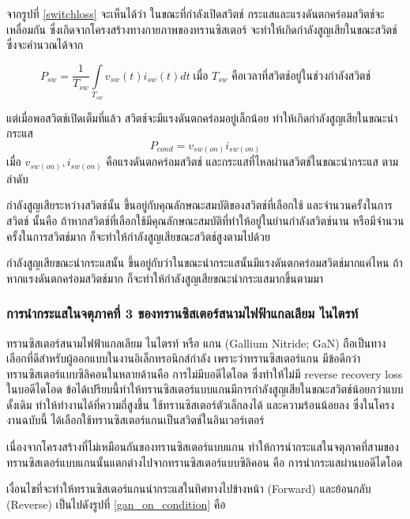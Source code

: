 \documentclass[11pt,a4paper]{article}
\begin{document}
จากรูปที่ \ref{switchloss} จะเห็นได้ว่า ในขณะที่กำลังเปิดสวิตช์ กระแสและแรงดันตกคร่อมสวิตช์จะเหลื่อมกัน ซึ่งเกิดจากโครงสร้างทางกายภาพของทรานซิสเตอร์ จะทำให้เกิดกำลังสูญเสียในขณะสวิตช์ ซึ่งจะคำนวณได้จาก

\begin{equation}
    P_{sw} = \frac{1}{T_{sw}}\int\limits_{T_{sw}}{v_{sw}(t)i_{sw}(t)dt}\; \text{เมื่อ $T_{sw}$ คือเวลาที่สวิตช์อยู่ในช่วงกำลังสวิตช์}
\end{equation}

แต่เมื่อพอสวิตช์เปิดเต็มที่แล้ว สวิตช์จะมีแรงดันตกคร่อมอยู่เล็กน้อย ทำให้เกิดกำลังสูญเสียในขณะนำกระแส
\begin{equation}
    P_{cond} = v_{sw(on)}i_{sw(on)}
\end{equation}
เมื่อ $v_{sw(on)},i_{sw(on)}$ คือแรงดันตกคร่อมสวิตช์ และกระแสที่ไหลผ่านสวิตช์ในขณะนำกระแส ตามลำดับ

กำลังสูญเสียระหว่างสวิตช์นั้น ขึ้นอยู่กับคุณลักษณะสมบัติของสวิตช์ที่เลือกใช้ และจำนวนครั้งในการสวิตช์ นั้นคือ ถ้าหากสวิตช์ที่เลือกใช้มีคุณลักษณะสมบัติที่ทำให้อยู่ในย่านกำลังสวิตช์นาน หรือมีจำนวนครั้งในการสวิตช์มาก ก็จะทำให้กำลังสูญเสียขณะสวิตช์สูงตามไปด้วย

กำลังสูญเสียขณะนำกระแสนั้น ขึ้นอยู่กับว่าในขณะนำกระแสนั้นมีแรงดันตกคร่อมสวิตช์มากแค่ไหน ถ้าหากแรงดันตกคร่อมสวิตช์มาก ก็จะทำให้กำลังสูญเสียขณะนำกระแสมากขึ้นตามมา

\subsubsection{การนำกระแสในจตุภาคที่ 3 ของทรานซิสเตอร์สนามไฟฟ้าแกลเลียม ไนไตรท์}
ทรานซิสเตอร์สนามไฟฟ้าแกลเลียม ไนไตรท์ หรือ แกน (Gallium Nitride; GaN) ถือเป็นทางเลือกที่ดีสำหรับผู้ออกแบบในงานอิเล็กทรอนิกส์กำลัง เพราะว่าทรานซิสเตอร์แกน มีข้อดีกว่าทรานซิสเตอร์แบบซิลิคอนในหลายด้านคือ การไม่มีบอดีไดโอด ซึ่งทำให้ไม่มี reverse recovery loss ในบอดีไดโอด ข้อได้เปรียบนี้ทำให้ทรานซิสเตอร์แบบแกนมีการกำลังสูญเสียในขณะสวิตช์น้อยกว่าแบบดั้งเดิม ทำให้ทำงานได้ที่ความถี่สูงขึ้น ใช้ทรานซิสเตอร์ตัวเล็กลงได้ และความร้อนน้อยลง ซึ่งในโครงงานฉบับนี้ ได้เลือกใช้ทรานซิสเตอร์แกนเป็นสวิตช์ในอินเวอร์เตอร์

เนื่องจากโครงสร้างที่ไม่เหมือนกันของทรานซิสเตอร์แบบแกน ทำให้การนำกระแสในจตุภาคที่สามของทรานซิสเตอร์แบบแกนนั้นแตกต่างไปจากทรานซิสเตอร์แบบซิลิคอน \cite{ganfet} คือ การนำกระแสผ่านบอดีไดโอด

เงื่อนไขที่จะทำให้ทรานซิสเตอร์แกนนำกระแสในทิศทางไปข้างหน้า (Forward) และย้อนกลับ (Reverse) เป็นไปดังรูปที่ \ref{gan_on_condition} คือ
\end{document}

